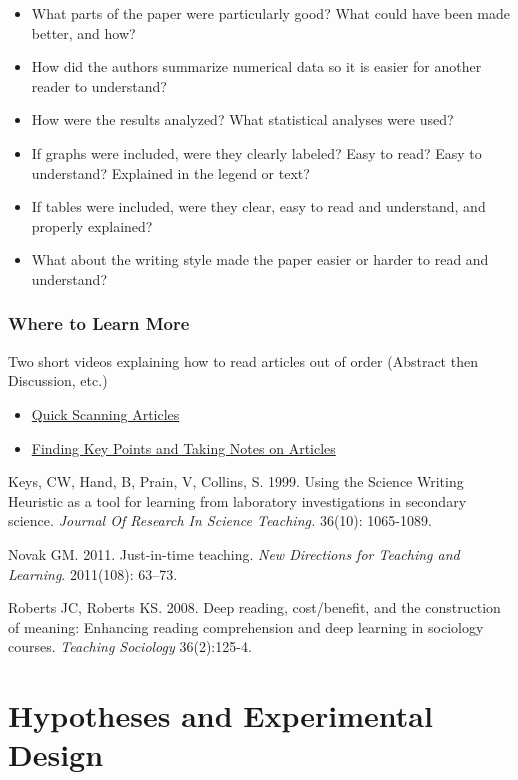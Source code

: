 \documentclass[
]{book}
\providecommand{\tightlist}{%
  \setlength{\itemsep}{0pt}\setlength{\parskip}{0pt}}
\begin{document}
\begin{itemize}
\tightlist
\item
  What parts of the paper were particularly good? What could have been made better, and how?
\item
  How did the authors summarize numerical data so it is easier for another reader to understand?
\item
  How were the results analyzed? What statistical analyses were used?
\item
  If graphs were included, were they clearly labeled? Easy to read? Easy to understand? Explained in the legend or text?
\item
  If tables were included, were they clear, easy to read and understand, and properly explained?
\item
  What about the writing style made the paper easier or harder to read and understand?
\end{itemize}

\hypertarget{where-to-learn-more-1}{%
\section{Where to Learn More}\label{where-to-learn-more-1}}

Two short videos explaining how to read articles out of order (Abstract then Discussion, etc.)

\begin{itemize}
\tightlist
\item
  \href{https://www.youtube.com/watch?v=3q9xTQIr4FM}{Quick Scanning Articles}
\item
  \href{https://www.youtube.com/watch?v=t2K6mJkSWoA}{Finding Key Points and Taking Notes on Articles}
\end{itemize}

Keys, CW, Hand, B, Prain, V, Collins, S. 1999. Using the Science Writing Heuristic as a tool for learning from laboratory investigations in secondary science. \emph{Journal Of Research In Science Teaching.} 36(10): 1065-1089.

Novak GM. 2011. Just-in-time teaching. \emph{New Directions for Teaching and Learning}. 2011(108): 63--73.

Roberts JC, Roberts KS. 2008. Deep reading, cost/benefit, and the construction of meaning: Enhancing reading comprehension and deep learning in sociology courses. \emph{Teaching Sociology} 36(2):125-4.

\hypertarget{part-hypotheses-and-experimental-design}{%
\part{Hypotheses and Experimental Design}\label{part-hypotheses-and-experimental-design}}
\end{document}
